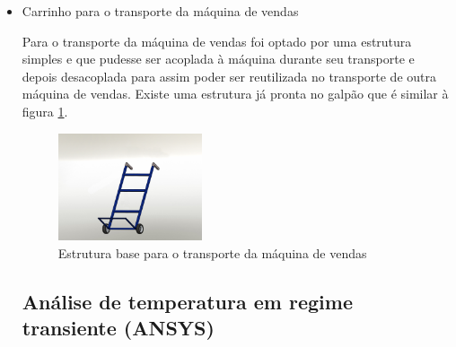\begin{itemize}
\item Carrinho para o transporte da máquina de vendas

	Para o transporte da máquina de vendas foi optado por uma estrutura simples e que pudesse ser acoplada à máquina durante seu transporte e depois desacoplada para assim poder ser reutilizada no transporte de outra máquina de vendas. Existe uma  estrutura já pronta no galpão que é similar à figura \ref{fig:Render_-_Carro_de_Transporte}.
    
   \begin{figure}[H]
	\centering
    \includegraphics[width=0.4\textwidth]{figuras/Render_-_Carro_de_Transporte}
    \caption{Estrutura base para o transporte da máquina de vendas}
    \label{fig:Render_-_Carro_de_Transporte}
\end{figure}

\subsection{Análise de temperatura em regime transiente (ANSYS)}


\end{itemize}
